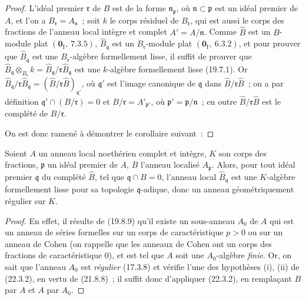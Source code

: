 \begin{proof}
L'idéal premier $\mathfrak r$ de $B$ est de la forme
$\mathfrak n_\mathfrak p$, où $\mathfrak n\subset\mathfrak p$ est un idéal
premier de $A$, et l'on a $B_\mathfrak r=A_\mathfrak n$~; soit $k$ le corps
résiduel de $B_\mathfrak r$, qui est aussi le corps des fractions de l'anneau
local intègre et complet $A'=A/\mathfrak n$. Comme $\widehat B$ est un
$B$-module plat $(\mathbf 0_\mathrm I,~7.3.5)$,
$\widehat B_\mathfrak q$ est un $B_\mathfrak r$-module plat
$(\mathbf 0_\mathrm I,~6.3.2)$, et pour prouver que
$\widehat B_\mathfrak q$ est une $B_\mathfrak r$-algèbre formellement
lisse, il suffit de prouver que
$\widehat B_\mathfrak q\otimes_{B_\mathfrak r}k=\widehat B_\mathfrak q/\mathfrak r\widehat B_\mathfrak q$
est une $k$-algèbre formellement lisse (19.7.1). Or
$\widehat B_\mathfrak q/\mathfrak r\widehat B_\mathfrak q
=(\widehat B/\mathfrak r\widehat B)_{\mathfrak q'}$, où $\mathfrak q'$ est
l'image canonique de $\mathfrak q$ dans
$\widehat B/\mathfrak r\widehat B$~; on a par définition
$\mathfrak q'\cap(B/\mathfrak r)=0$ et
$B/\mathfrak r=A'_{\mathfrak p'}$, où
$\mathfrak p'=\mathfrak p/\mathfrak n$~; en outre
$\widehat B/\mathfrak r\widehat B$ est le complété de $B/\mathfrak r$.

On est donc ramené à démontrer le corollaire suivant~:
\end{proof}

\begin{corollary}[22.3.4]
\label{0.22.3.4-fr}
Soient $A$ un anneau local noethérien \textup{complet} et intègre, $K$ son corps des
fractions, $\mathfrak p$ un idéal premier de $A$, $B$ l'anneau localisé
$A_\mathfrak p$. Alors, pour tout idéal premier $\mathfrak q$
du complété $\widehat B$, tel que $\mathfrak q\cap B=0$, l'anneau local
$\widehat B_\mathfrak q$ est une $K$-algèbre formellement lisse pour sa
topologie $\mathfrak q$-adique, donc un anneau géométriquement régulier sur
$K$.
\end{corollary}

\begin{proof}
En effet, il résulte de (19.8.9) qu'il existe un sous-anneau $A_0$ de $A$
qui est un anneau de séries formelles sur un corps de caractéristique $p>0$
ou sur un anneau de Cohen (on rappelle que les anneaux de Cohen ont un corps
des fractions de caractéristique $0$), et est tel que $A$ soit une
$A_0$-algèbre \emph{finie}. Or, on sait que l'anneau $A_0$ est \emph{régulier} (17.3.8) et
vérifie l'une des hypothèses (i), (ii) de (22.3.2), en vertu de (21.8.8)~;
il suffit donc d'appliquer (22.3.2), en remplaçant $B$ par $A$ et $A$ par
$A_0$.
\end{proof}

